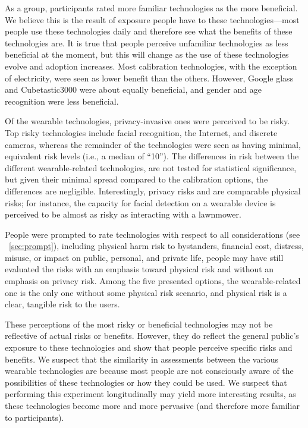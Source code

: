 As a group, participants rated more familiar technologies as the more beneficial. We believe this is the result of exposure people have to these technologies---most people use these technologies daily and therefore see what the benefits of these technologies are. It is true that people perceive unfamiliar technologies as less beneficial at the moment, but this will change as the use of these technologies evolve and adoption increases. Most calibration technologies, with the exception of electricity, were seen as lower benefit than the others. However, Google glass and Cubetastic3000 were about equally beneficial, and gender and age recognition were less beneficial. 

Of the wearable technologies, privacy-invasive ones were perceived to be risky. Top risky technologies include facial recognition, the Internet, and discrete cameras, whereas the remainder of the technologies were seen as having minimal,  equivalent risk levels (i.e., a median of ``10''). The differences in risk between the different wearable-related technologies, are not tested for statistical significance, but given their minimal spread compared to the calibration options, the differences are negligible. Interestingly, privacy risks and are comparable physical risks; for instance, the capacity for facial detection on a wearable device is perceived to be almost as risky as interacting with a lawnmower. 

People  were prompted to rate technologies with respect to all considerations (see ~\ref{sec:prompt}), including physical harm risk to bystanders, financial cost, distress, misuse, or impact on public, personal, and private life, people may have still evaluated the risks with an emphasis toward physical risk and without an emphasis on privacy risk. Among the five presented options, the wearable-related one is the only one without some physical risk scenario, and physical risk is a clear, tangible risk to the users. 

These perceptions of the most risky or beneficial technologies may not be reflective of actual risks or benefits. However, they do reflect the general public's exposure to these technologies and show that people perceive specific risks and benefits. We suspect that the similarity in assessments between the various wearable technologies are because most people are not consciously aware of the possibilities of these technologies or how they could be used. We suspect that performing this experiment longitudinally may yield more interesting results, as these technologies become more and more pervasive (and therefore more familiar to participants).
